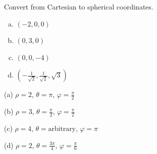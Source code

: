 \begin{question}
Convert from Cartesian to spherical coordinates.
\begin{enumerate}[(a)]
\item $(-2,0,0)$
\item $(0,3,0)$
\item $(0,0,-4)$
\item $\left(-\frac{1}{\sqrt{2}},\frac{1}{\sqrt{2}},\sqrt{3}\right)$
\end{enumerate}

\end{question}

%

\begin{answer}
(a) $\rho=2$, $\theta=\pi$, $\varphi=\frac{\pi}{2}$

(b) $\rho=3$, $\theta=\frac{\pi}{2}$, $\varphi=\frac{\pi}{2}$

(c) $\rho=4$, $\theta=\text{arbitrary}$, $\varphi=\pi$

(d) $\rho=2$, $\theta=\frac{3\pi}{4}$, $\varphi=\frac{\pi}{6}$

\end{answer}

